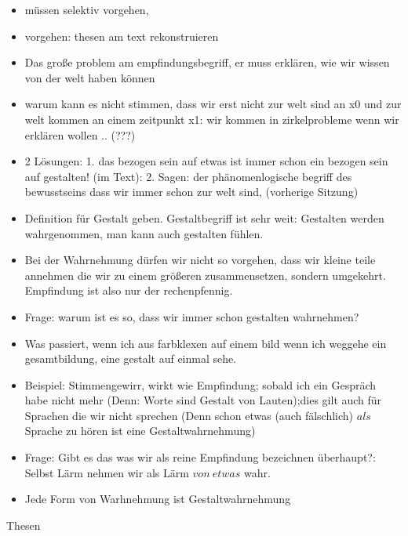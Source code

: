 \documentclass[emulatestandardclasses]{scrartcl}
\begin{document}
\begin{itemize}
  \item müssen selektiv vorgehen, 
  \item vorgehen: thesen am text rekonstruieren
  \item Das große problem am empfindungsbegriff, er muss erklären, wie wir wissen von der welt haben können
  \item warum kann es nicht stimmen, dass wir erst nicht zur welt sind an x0 und zur welt kommen an einem zeitpunkt x1: wir kommen in zirkelprobleme wenn wir erklären wollen .. (???)
  \item 2 Lösungen: 1. das bezogen sein auf etwas ist immer schon ein bezogen sein auf gestalten! (im Text): 2. Sagen: der phänomenlogische begriff des bewusstseins dass wir immer schon zur welt sind, (vorherige Sitzung)
  \item Definition für Gestalt geben. Gestaltbegriff ist sehr weit: Gestalten werden wahrgenommen, man kann auch gestalten fühlen. 
  \item Bei der Wahrnehmung dürfen wir nicht so vorgehen, dass wir kleine teile annehmen die wir zu einem größeren zusammensetzen, sondern umgekehrt. Empfindung ist also nur der rechenpfennig.
  \item Frage: warum ist es so, dass wir immer schon gestalten wahrnehmen?
  \item Was passiert, wenn ich aus farbklexen auf einem bild wenn ich weggehe ein gesamtbildung, eine gestalt auf einmal sehe.
  \item Beispiel: Stimmengewirr, wirkt wie Empfindung; sobald ich ein Gespräch habe nicht mehr (Denn: Worte sind Gestalt von Lauten);dies gilt auch für Sprachen die wir nicht sprechen (Denn schon etwas (auch fälschlich) $als$ Sprache zu hören ist eine Gestaltwahrnehmung) 
  \item Frage: Gibt es das was wir als reine Empfindung bezeichnen überhaupt?: Selbst Lärm nehmen wir als Lärm $von \ etwas$ wahr.
  \item Jede Form von Warhnehmung ist Gestaltwahrnehmung
\end{itemize}

Thesen
\end{document}
